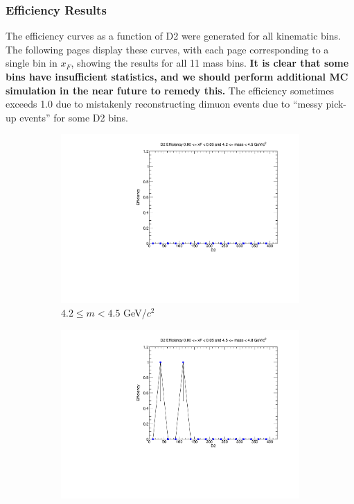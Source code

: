 \documentclass[11pt]{article}
\begin{document}
\subsubsection{Efficiency Results}
The efficiency curves as a function of D2 were generated for all kinematic bins. The following pages display these curves, with each page corresponding to a single bin in $x_F$, showing the results for all 11 mass bins.  {\bf It is clear that some bins have insufficient statistics, and we should perform additional MC simulation in the near future to remedy this.} The efficiency sometimes exceeds 1.0 due to mistakenly reconstructing dimuon events due to ``messy pick-up events'' for some D2 bins.

\begin{figure}[p]
    \centering
    \begin{subfigure}[b]{0.32\textwidth}
        \centering
        \includegraphics[width=\textwidth]{./kTrackerEfficiencyPlots/D2_Efficiency_xF0_mass0.pdf}
        \caption{$4.2 \leq m < 4.5$ GeV/$c^2$}
    \end{subfigure}\hfill
    \begin{subfigure}[b]{0.32\textwidth}
        \centering
        \includegraphics[width=\textwidth]{./kTrackerEfficiencyPlots/D2_Efficiency_xF0_mass1.pdf}

\end{subfigure}
\end{figure}
\end{document}

